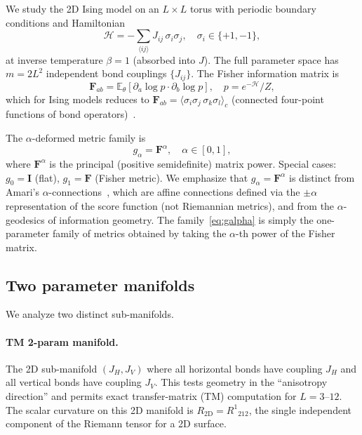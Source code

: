 \documentclass[twocolumn,showpacs,preprintnumbers,amsmath,amssymb,prl]{revtex4-2}
\newcommand{\Fmat}{\mathbf{F}}
\newcommand{\RtwoD}{R_{\mathrm{2D}}}
\begin{document}
We study the 2D Ising model on an $L \times L$ torus with periodic boundary
conditions and Hamiltonian
\begin{equation}
  \mathcal{H} = -\sum_{\langle ij \rangle} J_{ij}\, \sigma_i \sigma_j,
  \quad \sigma_i \in \{+1,-1\},
\end{equation}
at inverse temperature $\beta = 1$ (absorbed into $J$).
The full parameter space has $m = 2L^2$ independent bond couplings $\{J_{ij}\}$.
The Fisher information matrix is
\begin{equation}
  \Fmat_{ab} = \mathbb{E}_\theta[\partial_a \log p \cdot \partial_b \log p],
  \quad p = e^{-\mathcal{H}}/Z,
\end{equation}
which for Ising models reduces to
$\Fmat_{ab} = \langle \sigma_i\sigma_j\,\sigma_k\sigma_l\rangle_c$
(connected four-point functions of bond operators)~\cite{ZhuravlevPaper7}.

The $\alpha$-deformed metric family is
\begin{equation}
  \label{eq:galpha}
  g_\alpha = \Fmat^\alpha,\quad \alpha \in [0,1],
\end{equation}
where $\Fmat^\alpha$ is the principal (positive semidefinite) matrix power.
Special cases: $g_0 = \mathbf{I}$ (flat), $g_1 = \Fmat$ (Fisher metric).
We emphasize that $g_\alpha = \Fmat^\alpha$ is distinct from Amari's
$\alpha$-connections~\cite{Amari2000}, which are affine connections defined
via the $\pm\alpha$ representation of the score function (not Riemannian
metrics), and from the $\alpha$-geodesics of information geometry.
The family~\eqref{eq:galpha} is simply the one-parameter family of metrics
obtained by taking the $\alpha$-th power of the Fisher matrix.

\subsection{Two parameter manifolds}

We analyze two distinct sub-manifolds.

\paragraph{TM 2-param manifold.}
The 2D sub-manifold $(J_H, J_V)$ where all horizontal bonds have coupling $J_H$
and all vertical bonds have coupling $J_V$. This tests geometry in the
``anisotropy direction'' and permits exact transfer-matrix (TM) computation for
$L = 3$--$12$.
The scalar curvature on this 2D manifold is $\RtwoD = R^1{}_{212}$, the
single independent component of the Riemann tensor for a 2D surface.
\end{document}
